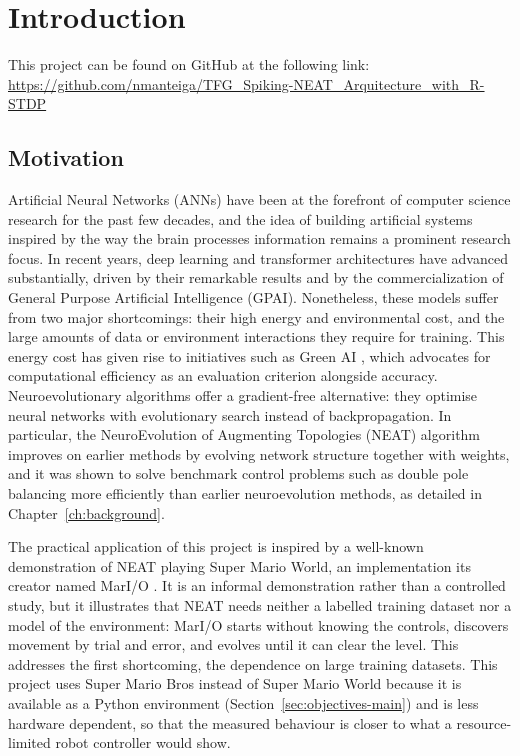 \chapter{Introduction}

This project can be found on GitHub at the following link: \url{https://github.com/nmanteiga/TFG_Spiking-NEAT_Arquitecture_with_R-STDP}

\section{Motivation}
Artificial Neural Networks (ANNs) have been at the forefront of computer science research for the past few decades, and the idea of building artificial systems inspired by the way the brain processes information remains a prominent research focus. In recent years, deep learning and transformer architectures have advanced substantially, driven by their remarkable results and by the commercialization of General Purpose Artificial Intelligence (GPAI). Nonetheless, these models suffer from two major shortcomings: their high energy and environmental cost, and the large amounts of data or environment interactions they require for training. This energy cost has given rise to initiatives such as Green AI \cite{schwartz2020green}, which advocates for computational efficiency as an evaluation criterion alongside accuracy. Neuroevolutionary algorithms offer a gradient-free alternative: they optimise neural networks with evolutionary search instead of backpropagation. In particular, the NeuroEvolution of Augmenting Topologies (NEAT) algorithm \cite{stanley2002} improves on earlier methods by evolving network structure together with weights, and it was shown to solve benchmark control problems such as double pole balancing more efficiently than earlier neuroevolution methods, as detailed in Chapter~\ref{ch:background}.

The practical application of this project is inspired by a well-known demonstration of NEAT playing Super Mario World, an implementation its creator named MarI/O \cite{sethbling2015mario}. It is an informal demonstration rather than a controlled study, but it illustrates that NEAT needs neither a labelled training dataset nor a model of the environment: MarI/O starts without knowing the controls, discovers movement by trial and error, and evolves until it can clear the level. This addresses the first shortcoming, the dependence on large training datasets. This project uses Super Mario Bros instead of Super Mario World because it is available as a Python environment (Section~\ref{sec:objectives-main}) and is less hardware dependent, so that the measured behaviour is closer to what a resource-limited robot controller would show.

